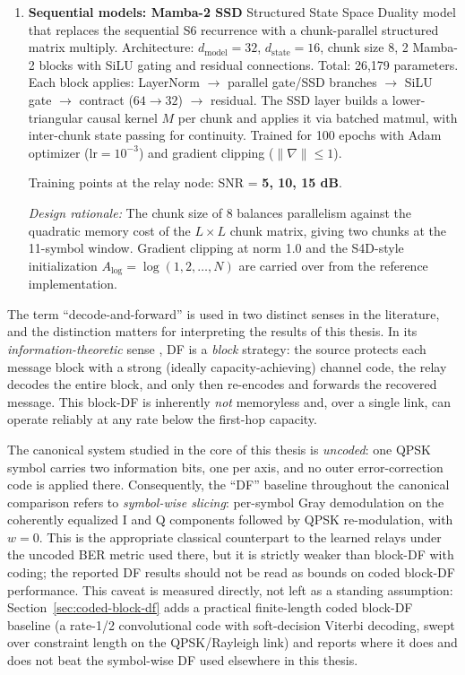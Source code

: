 \begin{enumerate}
\item \textbf{Sequential models: Mamba-2 SSD} Structured State Space Duality model that replaces the sequential S6 recurrence with a chunk-parallel structured matrix multiply. Architecture: \(d_{\text{model}}=32\), \(d_{\text{state}}=16\), chunk size 8, 2 Mamba-2 blocks with SiLU gating and residual connections. Total: 26,179 parameters. Each block applies: LayerNorm $\to$ parallel gate/SSD branches $\to$ SiLU gate $\to$ contract (\(64 \to 32\)) $\to$ residual. The SSD layer builds a lower-triangular causal kernel \(M\) per chunk and applies it via batched matmul, with inter-chunk state passing for continuity. Trained for 100 epochs with Adam optimizer (\(\text{lr}=10^{-3}\)) and gradient clipping (\(\|\nabla\| \le 1\)).

  Training points at the relay node: SNR = \textbf{5, 10, 15 dB}.

  \emph{Design rationale:} The chunk size of 8 balances parallelism against the quadratic memory cost of the $L\times L$ chunk matrix, giving two chunks at the 11-symbol window. Gradient clipping at norm 1.0 and the S4D-style initialization $A_{\log}=\log(1,2,\dots,N)$ are carried over from the reference implementation.

\end{enumerate}

\begin{remark}\label{rem:df-terminology}
The term ``decode-and-forward'' is used in two distinct senses in the literature, and the distinction matters for interpreting the results of this thesis. In its \emph{information-theoretic} sense \cite{CoverGamal1979RelayChannel,ElGamalKim2011NetworkIT}, DF is a \emph{block} strategy: the source protects each message block with a strong (ideally capacity-achieving) channel code, the relay decodes the entire block, and only then re-encodes and forwards the recovered message. This block-DF is inherently \emph{not} memoryless and, over a single link, can operate reliably at any rate below the first-hop capacity.

The canonical system studied in the core of this thesis is \emph{uncoded}: one QPSK symbol carries two information bits, one per axis, and no outer error-correction code is applied there. Consequently, the ``DF'' baseline throughout the canonical comparison refers to \emph{symbol-wise slicing}: per-symbol Gray demodulation on the coherently equalized I and Q components followed by QPSK re-modulation, with $w=0$. This is the appropriate classical counterpart to the learned relays under the uncoded BER metric used there, but it is strictly weaker than block-DF with coding; the reported DF results should not be read as bounds on coded block-DF performance. This caveat is measured directly, not left as a standing assumption: Section~\ref{sec:coded-block-df} adds a practical finite-length coded block-DF baseline (a rate-1/2 convolutional code with soft-decision Viterbi decoding, swept over constraint length on the QPSK/Rayleigh link) and reports where it does and does not beat the symbol-wise DF used elsewhere in this thesis.
\end{remark}

